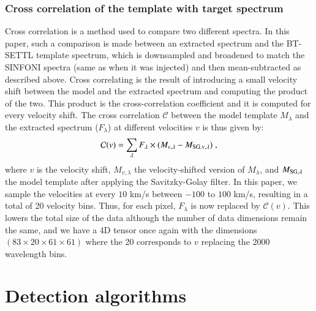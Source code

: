 \documentclass{aa}
\begin{document}
\subsubsection{Cross correlation of the template with target spectrum}\label{sec: CC algorithm}

Cross correlation is a method used to compare two different spectra.
In this paper, such a comparison is made between an extracted spectrum and the BT-SETTL template spectrum, which is downsampled and broadened to match the SINFONI spectra (same as when it was injected) and then mean-subtracted as described above.
Cross correlating is the result of introducing a small velocity shift between the model and the extracted spectrum and computing the product of the two.
This product is the cross-correlation coefficient and it is computed for every velocity shift.
The cross correlation $\mathcal{C}$ between the model template $M_{\lambda}$ and the extracted spectrum ($F_{\lambda}$) at different velocities $v$ is thus given by:
\begin{equation}
    \mathcal{C}(v) = \sum\limits_{\lambda}F_{\rm{\lambda}}\times (M_{v,\lambda}-M_{\rm{SG},v,\lambda})  \; ,
    \label{eq:CC equation}
\end{equation}
where $v$ is the velocity shift, $M_{v,\lambda}$ the velocity-shifted version of $M_{\lambda}$, and $M_{\rm{SG},\lambda}$ the model template after applying the Savitzky-Golay filter.
In this paper, we sample the velocities at every $10$ km/s between $-100$ to $100$ km/s, resulting in a total of 20 velocity bins. Thus, for each pixel, $F_\lambda$ is now replaced by $\mathcal{C}(v)$. This lowers the total size of the data although the number of data dimensions remain the same, and we have a 4D tensor once again with the dimensions $\left(83\times20\times61\times61\right)$ where the 20 corresponds to $v$ replacing the 2000 wavelength bins.



\section{Detection algorithms}
\label{sec:mapbased}
\end{document}
